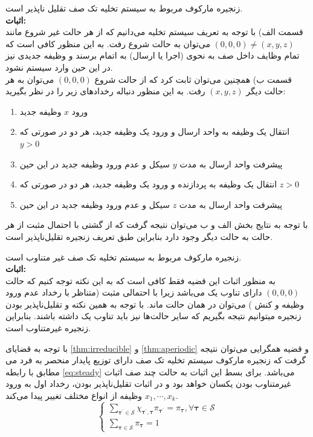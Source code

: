 \begin{thm}
\label{thm:irreducible}
زنجیره مارکوف مربوط به سیستم تخلیه تک صف تقلیل ناپذیر است. \\
\textbf{اثبات:} \\
قسمت الف) با توجه به تعریف سیستم تخلیه می‌دانیم که از هر حالت غیر شروع مانند \( (0, 0, 0) \neq (x, y, z)\) می‌توان به حالت شروع رفت. به این منظور کافی است که تمام وظایف داخل صف به نحوی (اجرا یا ارسال) به اتمام برسند و وظیفه جدیدی نیز در این حین وارد سیستم نشود. \\

قسمت ب) همچنین می‌توان ثابت کرد که از حالت شروع \((0, 0, 0)\) می‌توان به هر حالت دیگر \((x, y, z)\) رفت. به این منظور دنباله رخدادهای زیر را در نظر بگیرید:
\begin{enumerate}
	\item ورود \(x\) وظیفه جدید
	\item انتقال یک وظیفه به واحد ارسال و ورود یک وظیفه جدید، هر دو در صورتی که \(y > 0\)
	\item پیشرفت واحد ارسال به مدت \(y\) سیکل و عدم ورود وظیفه جدید در این حین
	\item انتقال یک وظیفه به پردازنده و ورود یک وظیفه جدید، هر دو در صورتی که \(z > 0\)
	\item پیشرفت واحد ارسال به مدت \(z\) سیکل و عدم ورود وظیفه جدید در این حین
\end{enumerate}
با توجه به نتایج بخش الف و ب می‌توان نتیجه گرفت که از گشتی با احتمال مثبت از هر حالت به حالت دیگر وجود دارد بنابراین طبق تعریف زنجیره تقلیل‌ناپذیر است.
\end{thm}
\begin{thm}
\label{thm:aperiodic}
زنجیره مارکوف مربوط به سیستم تخلیه تک صف غیر متناوب است. \\
\textbf{اثبات:} \\
به منظور اثبات این قضیه فقط کافی است که به این نکته توجه کنیم که حالت \((0, 0, 0)\) دارای تناوب یک می‌باشد زیرا با احتمالی مثبت (متناظر با رخداد عدم ورود وظیفه و کنش ) می‌توان در همان حالت ماند. با توجه به همین نکته و تقلیل‌ناپذیر بودن زنجیره میتوانیم نتیجه بگیریم که سایر حالت‌ها نیز باید تناوب یک داشته باشند. بنابراین زنجیره غیرمتناوب است.
\end{thm}
با توجه به قضایای \ref{thm:irreducible} و \ref{thm:aperiodic} و قضیه همگرایی می‌توان نتیجه گرفت که زنجیره مارکوف سیستم تخلیه تک صف دارای توزیع پایدار منحصر به فرد می‌ مطابق با رابطه \ref{eq:steady} می‌باشد. برای بسط این اثبات به حالت چند صف اثبات غیرمتناوب بودن یکسان خواهد بود و در اثبات تقلیل‌ناپذیر بودن، رخداد اول به ورود \(x_1, \cdots, x_k\) وظیفه از انواع مختلف تغییر پیدا می‌کند.
\begin{equation}
	\label{eq:steady}
	\left\{\begin{array}{l}
		\sum_{\boldsymbol{\tau}^{\prime} \in \mathcal{S}} \chi_{\boldsymbol{\tau}^{\prime}, \boldsymbol{\tau}} \pi_{\boldsymbol{\tau}^{\prime}}=\pi_{\boldsymbol{\tau}}, \forall \boldsymbol{\tau} \in \mathcal{S} \\
		\sum_{\boldsymbol{\tau} \in \mathcal{S}} \pi_{\boldsymbol{\tau}}=1
	\end{array}\right.
\end{equation}
